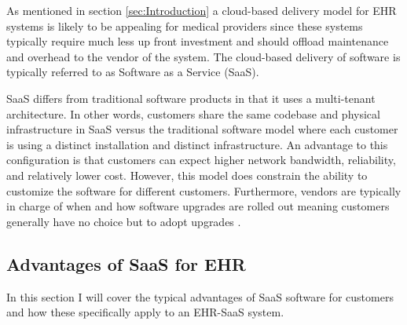 \documentclass[10pt]{article}
\begin{document}
As mentioned in section \ref{sec:Introduction} a cloud-based delivery model for EHR systems is likely to be appealing for medical providers since these systems typically require much less up front investment and should offload maintenance and overhead to the vendor of the system.
The cloud-based delivery of software is typically referred to as Software as a Service (SaaS).

SaaS differs from traditional software products in that it uses a multi-tenant architecture.
In other words, customers share the same codebase and physical infrastructure in SaaS versus the traditional software model where each customer is using a distinct installation and distinct infrastructure.
An advantage to this configuration is that customers can expect higher network bandwidth, reliability, and relatively lower cost.
However, this model does constrain the ability to customize the software for different customers.
Furthermore, vendors are typically in charge of when and how software upgrades are rolled out meaning customers generally have no choice but to adopt upgrades \cite{saasqual}.



\subsection{Advantages of SaaS for EHR}
\label{sec:SaaS Adantages}

In this section I will cover the typical advantages of SaaS software for customers and how these specifically apply to an EHR-SaaS system.
\end{document}
